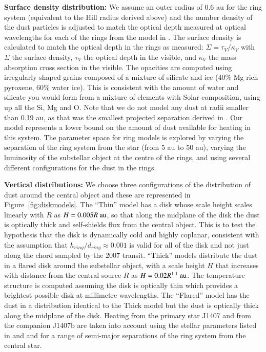 \documentclass[twocolumn]{aa} %
\begin{document}
{\bf Surface density distribution:} We assume an outer radius of 0.6 au for the ring system (equivalent to the Hill radius derived above) and the number density of the dust particles is adjusted to match the optical depth measured at optical wavelengths for each of the rings from the model in \citet{Kenworthy15b}.
%
The surface density is calculated to match the optical depth in the rings as measured: $\Sigma = \tau_V/\kappa_V$ with $\Sigma$ the surface density, $\tau_V$ the optical depth in the visible, and $\kappa_V$ the mass absorption cross section in the visible.
%
The opacities are computed using irregularly shaped grains \citep[applying the method by][]{Min05} composed of a mixture of silicate and ice (40\% Mg rich pyroxene, 60\% water ice).
%
This is consistent with the amount of water and silicate you would form from a mixture of elements with Solar composition, using up all the Si, Mg and O.
%
Note that we do not model any dust at radii smaller than 0.19 au, as that was the smallest projected separation derived in \citet{Kenworthy15b}.
%
Our model represents a lower bound on the amount of dust available for heating in this system.
%
The parameter space for ring models is explored by varying the separation of the ring system from the star (from 5 au to 50 au), varying the luminosity of the substellar object at the centre of the rings, and using several different configurations for the dust in the rings. 

{\bf Vertical distributions:} We choose three configurations of the distribution of dust around the central object and these are represented in Figure~\ref{fig:diskmodels}.
%
The ``Thin'' model has a disk whose scale height scales linearly with $R$ as $H=0.005 R\rm{~au}$, so that along the midplane of the disk the dust is optically thick and self-shields flux from the central object.
%
This is to test the hypothesis that the disk is dynamically cold and highly coplanar, consistent with the assumption that  $h_{ring}/d_{ring}\approx 0.001$ is valid for all of the disk and not just along the chord sampled by the 2007 transit.
%
``Thick'' models distribute the dust in a flared disk around the substellar object, with a scale height $H$ that increases with distance from the central source $R$ as $H=0.02 R^{1.1}\rm{~au}$.
%
The temperature structure is computed assuming the disk is optically thin which provides a brightest possible disk at millimetre wavelengths.
%
The ``Flared'' model has the dust in a distribution identical to the Thick model but the dust is optically thick along the midplane of the disk.
%
Heating from the primary star J1407 and from the companion J1407b are taken into account using the stellar parameters listed in \citet{vanWerkhoven14} and \citet{Kenworthy15} and for a range of semi-major separations of the ring system from the central star.
\end{document}
